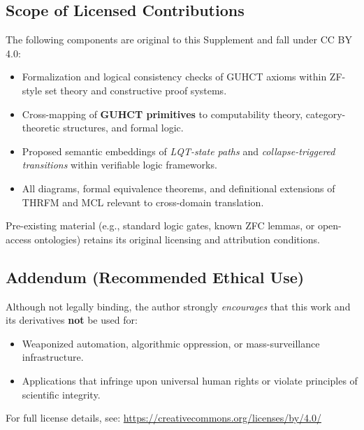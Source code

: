 \documentclass[11pt,a4paper]{article}
\begin{document}
\subsection*{Scope of Licensed Contributions}
The following components are original to this Supplement and fall under CC BY 4.0:
\begin{itemize}
\item Formalization and logical consistency checks of GUHCT axioms within ZF-style set theory and constructive proof systems.
\item Cross-mapping of \textbf{GUHCT primitives} to computability theory, category-theoretic structures, and formal logic.
\item Proposed semantic embeddings of \emph{LQT-state paths} and \emph{collapse-triggered transitions} within verifiable logic frameworks.
\item All diagrams, formal equivalence theorems, and definitional extensions of THRFM and MCL relevant to cross-domain translation.
\end{itemize}
Pre-existing material (e.g., standard logic gates, known ZFC lemmas, or open-access ontologies) retains its original licensing and attribution conditions.

\subsection*{Addendum (Recommended Ethical Use)}
Although not legally binding, the author strongly \emph{encourages} that this work and its derivatives \textbf{not} be used for:
\begin{itemize}
\item Weaponized automation, algorithmic oppression, or mass-surveillance infrastructure.
\item Applications that infringe upon universal human rights or violate principles of scientific integrity.
\end{itemize}

\vspace{0.5em}
For full license details, see: \url{https://creativecommons.org/licenses/by/4.0/}
\end{document}
